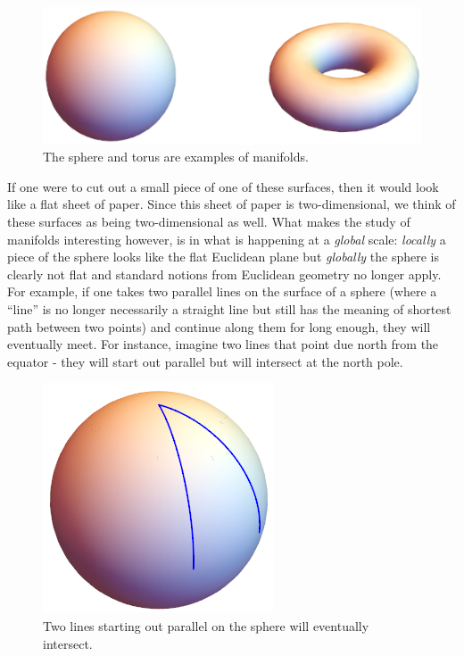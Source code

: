 \documentclass[12pt,a4paper]{article}
\numberwithin{equation}{section}
\theoremstyle{definition}
\theoremstyle{remark}
\begin{document}
\begin{figure}[h!]
\centering
\includegraphics[scale=0.675]{fig/fig1a}
\caption{The sphere and torus are examples of manifolds.}
\end{figure}

If one were to cut out a small piece of one of these surfaces, then it would look like a flat sheet of paper. Since this sheet of paper is two-dimensional, we think of these surfaces as being two-dimensional as well. What makes the study of manifolds interesting however, is in what is happening at a \textit{global} scale: \textit{locally} a piece of the sphere looks like the flat Euclidean plane but \textit{globally} the sphere is clearly not flat and standard notions from Euclidean geometry no longer apply. For example, if one takes two parallel lines on the surface of a sphere (where a ``line'' is no longer necessarily a straight line but still has the meaning of shortest path between two points) and continue along them for long enough, they will eventually meet. For instance, imagine two lines that point due north from the equator - they will start out parallel but will intersect at the north pole.\\

\begin{figure}[h!]
\centering
\includegraphics[scale=0.675]{fig/fig2a}
\caption{Two lines starting out parallel on the sphere will eventually intersect.}
\end{figure}
\end{document}
